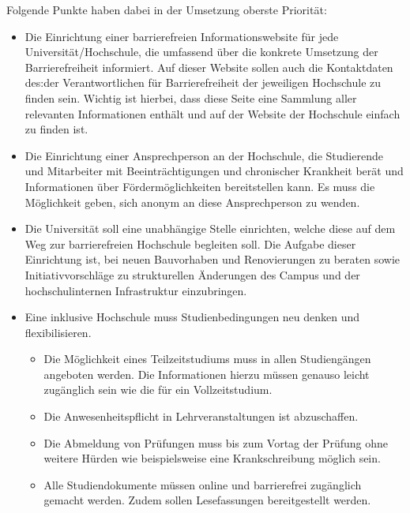 \documentclass[DIV=calc]{scrartcl}
\begin{document}
Folgende Punkte haben dabei in der Umsetzung oberste Priorität:
\begin{itemize}
    \item Die Einrichtung einer barrierefreien Informationswebsite für jede Universität/Hochschule, die umfassend über die konkrete Umsetzung der Barrierefreiheit informiert. Auf dieser Website sollen auch die Kontaktdaten des:der Verantwortlichen für Barrierefreiheit der jeweiligen Hochschule zu finden sein. Wichtig ist hierbei, dass diese Seite eine Sammlung aller relevanten Informationen enthält und auf der Website der Hochschule einfach zu finden ist.
   
  \item  Die Einrichtung einer Ansprechperson an der Hochschule, die Studierende und Mitarbeiter mit Beeinträchtigungen und chronischer Krankheit berät und Informationen über Fördermöglichkeiten bereitstellen kann. Es muss die Möglichkeit geben, sich anonym an diese Ansprechperson zu wenden.
  
  \item Die Universität soll eine unabhängige Stelle einrichten, welche diese auf dem Weg zur barrierefreien Hochschule begleiten soll. Die Aufgabe dieser Einrichtung ist, bei neuen Bauvorhaben und Renovierungen zu beraten sowie Initiativvorschläge zu strukturellen Änderungen des Campus und der hochschulinternen Infrastruktur einzubringen. %
    
   \item  Eine inklusive Hochschule muss Studienbedingungen neu denken und flexibilisieren. 
   \begin{itemize}
       \item Die Möglichkeit eines Teilzeitstudiums muss in allen Studiengängen angeboten werden. Die Informationen hierzu müssen genauso leicht zugänglich sein wie die für ein Vollzeitstudium.
       \item  Die Anwesenheitspflicht in Lehrveranstaltungen ist abzuschaffen. 
       \item  Die Abmeldung von Prüfungen muss bis zum Vortag der Prüfung ohne weitere Hürden wie beispielsweise eine Krankschreibung möglich sein. 
       \item  Alle Studiendokumente müssen online und barrierefrei zugänglich gemacht werden. Zudem sollen Lesefassungen bereitgestellt werden.
   \end{itemize}
\end{itemize}
\end{document}
